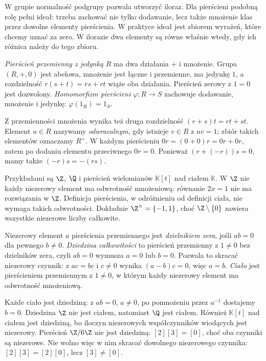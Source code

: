 W grupie normalność podgrupy pozwala utworzyć
iloraz. Dla pierścieni podobną rolę pełni ideał:
trzeba zachować nie tylko dodawanie, lecz także
mnożenie klas przez dowolne elementy pierścienia.
W praktyce ideał jest zbiorem wyrażeń, które chcemy
uznać za zero. W ilorazie dwa elementy są równe
właśnie wtedy, gdy ich różnica należy do tego zbioru.

\begin{definicja}
\label{def:pierscien-przemienny}
\emph{Pierścień przemienny z jedynką} $R$ ma
dwa działania $+$ i mnożenie. Grupa $(R,+,0)$
jest abelowa, mnożenie jest łączne i przemienne,
ma jedynkę $1$, a rozdzielność
$r(s+t)=rs+rt$ wiąże oba działania.
Pierścień zerowy z $1=0$ jest dozwolony.
\emph{Homomorfizm pierścieni}
$\varphi:R\to S$ zachowuje dodawanie, mnożenie
i jedynkę: $\varphi(1_R)=1_S$.
\end{definicja}

Z przemienności mnożenia wynika też druga rozdzielność
$(r+s)t=rt+st$. Element $u\in R$ nazywamy
\emph{odwracalnym}, gdy istnieje $v\in R$ z $uv=1$;
zbiór takich elementów oznaczamy $R^\times$.
W każdym pierścieniu $0r=(0+0)r=0r+0r$,
zatem po dodaniu elementu przeciwnego $0r=0$.
Ponieważ $(r+(-r))s=0$, mamy także $(-r)s=-(rs)$.

Przykładami są $\Z$, $\Q$ i pierścień
wielomianów $\mathbb K[t]$ nad ciałem $\mathbb K$.
W $\Z$ nie każdy niezerowy element ma odwrotność
mnożeniową: równanie $2x=1$ nie ma rozwiązania
w $\Z$. Definicja pierścienia, w odróżnieniu od definicji
ciała, nie wymaga takich odwrotności. Dokładnie
$\Z^\times=\{-1,1\}$, choć $\Z\setminus\{0\}$ zawiera wszystkie
niezerowe liczby całkowite.

\begin{definicja}
\label{def:dziedzina-cialo-5}
Niezerowy element $a$ pierścienia przemiennego jest \emph{dzielnikiem
zera}, jeśli $ab=0$ dla pewnego $b\ne0$. \emph{Dziedzina całkowitości}
to pierścień przemienny z $1\ne0$ bez dzielników zera, czyli
$ab=0$ wymusza $a=0$ lub $b=0$. Pozwala to skracać niezerowy czynnik:
z $ac=bc$ i $c\ne0$ wynika $(a-b)c=0$, więc $a=b$.
\emph{Ciało} jest pierścieniem przemiennym z $1\ne0$, w którym
każdy niezerowy element ma odwrotność mnożeniową.
\end{definicja}

Każde ciało jest dziedziną: z $ab=0$, $a\ne0$, po pomnożeniu
przez $a^{-1}$ dostajemy $b=0$. Dziedzina $\Z$ nie jest ciałem,
natomiast $\Q$ jest ciałem. Również $\mathbb K[t]$ nad ciałem
jest dziedziną, bo iloczyn niezerowych współczynników wiodących
jest niezerowy. Pierścień $\Z/6\Z$ nie jest dziedziną:
$[2][3]=[0]$, choć oba czynniki są niezerowe.
Nie wolno więc w nim skracać dowolnego niezerowego czynnika:
$[2][3]=[2][0]$, lecz $[3]\ne[0]$.

